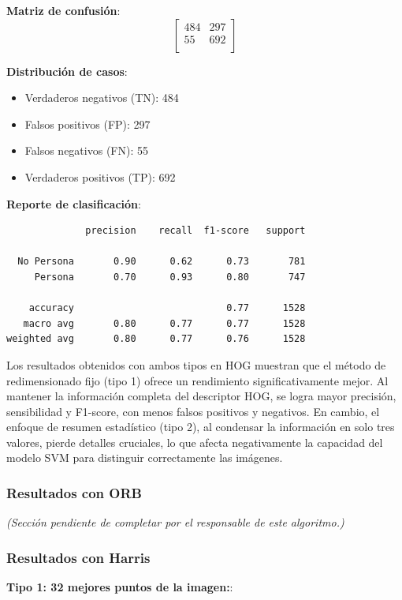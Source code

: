 \documentclass[a4paper]{article}
\begin{document}
\textbf{Matriz de confusión}:
\[
\begin{bmatrix}
484 & 297 \\
55 & 692 \\
\end{bmatrix}
\]

\textbf{Distribución de casos}:
\begin{itemize}
    \item Verdaderos negativos (TN): 484
    \item Falsos positivos (FP): 297
    \item Falsos negativos (FN): 55
    \item Verdaderos positivos (TP): 692
\end{itemize}

\textbf{Reporte de clasificación}:

\begin{verbatim}
              precision    recall  f1-score   support

  No Persona       0.90      0.62      0.73       781
     Persona       0.70      0.93      0.80       747

    accuracy                           0.77      1528
   macro avg       0.80      0.77      0.77      1528
weighted avg       0.80      0.77      0.76      1528
\end{verbatim}

Los resultados obtenidos con ambos tipos en HOG muestran que el método de redimensionado 
fijo (tipo 1) ofrece un rendimiento significativamente mejor. Al mantener la información 
completa del descriptor HOG, se logra mayor precisión, sensibilidad y F1-score, con menos 
falsos positivos y negativos. En cambio, el enfoque de resumen estadístico (tipo 2), al 
condensar la información en solo tres valores, pierde detalles cruciales, lo que afecta negativamente 
la capacidad del modelo SVM para distinguir correctamente las imágenes.


\vspace{0.5cm}
\subsubsection*{Resultados con ORB}

\textit{(Sección pendiente de completar por el responsable de este algoritmo.)}

\vspace{0.5cm}
\subsubsection*{Resultados con Harris}
\textbf{Tipo 1: 32 mejores puntos de la imagen:}:
\end{document}
